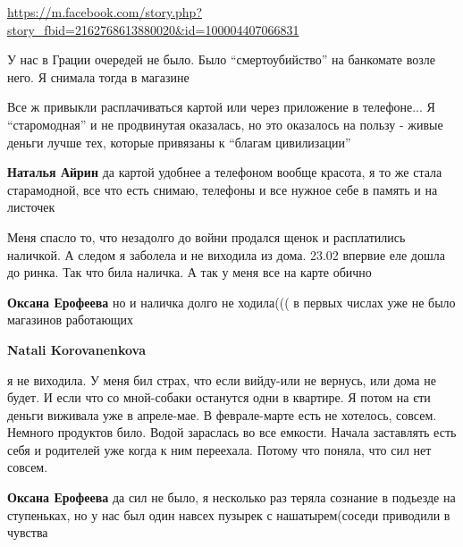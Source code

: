  
 
 
 
 

\qqSecCmt


\url{https://m.facebook.com/story.php?story_fbid=2162768613880020&id=100004407066831}


У нас в Грации очередей не было. Было \enquote{смертоубийство} на банкомате возле него. Я снимала тогда в магазине


Все ж привыкли расплачиваться картой или через приложение в телефоне... Я
\enquote{старомодная} и не продвинутая оказалась, но это оказалось на пользу - живые
деньги лучше тех, которые привязаны к \enquote{благам цивилизации}

\begin{itemize} %
\textbf{Наталья Айрин} да картой удобнее а телефоном вообще красота, я то же стала старамодной, все что есть снимаю, телефоны и все нужное себе в память и на листочек
\end{itemize} %


Меня спасло то, что незадолго до войни продался щенок и расплатились наличкой.
А следом я заболела и не виходила из дома. 23.02 впервие еле дошла до ринка.
Так что била наличка. А так у меня все на карте обично

\begin{itemize} %
\textbf{Оксана Ерофеева} но и наличка долго не ходила((( в первых числах уже не было магазинов работающих

\textbf{Natali Korovanenkova} 

я не виходила. У меня бил страх, что если вийду-или не вернусь, или дома не
будет. И если что со мной-собаки останутся одни в квартире. Я потом на єти
деньги виживала уже в апреле-мае. В феврале-марте есть не хотелось, совсем.
Немного продуктов било. Водой зараслась во все емкости. Начала заставлять есть
себя и родителей уже когда к ним переехала. Потому что поняла, что сил нет
совсем.

\textbf{Оксана Ерофеева} да сил не было, я несколько раз теряла сознание в подьезде на ступеньках, но у нас был один навсех пузырек с нашатырем(соседи приводили в чувства
\end{itemize} %

